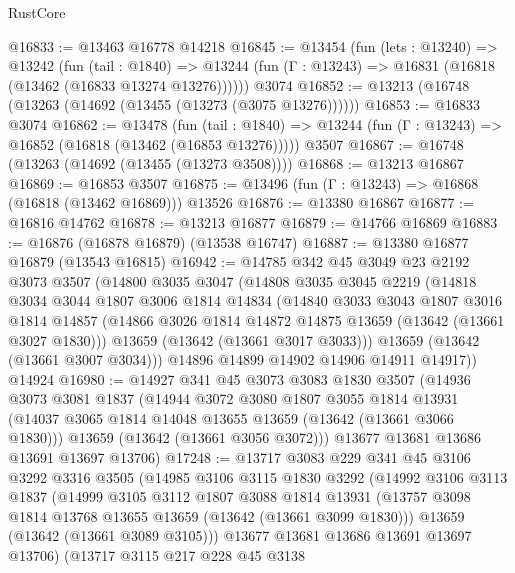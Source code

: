 \begin{lexlean}{RustCore}
\begin{coremodule}
@16833 := @13463 @16778 @14218
@16845 := @13454
    (fun (lets : @13240) =>
    @13242
      (fun (tail : @1840) =>
      @13244 (fun (Γ : @13243) => @16831 (@16818 (@13462 (@16833 @13274 @13276))))))
    @3074
@16852 := @13213 (@16748 (@13263 (@14692 (@13455 (@13273 (@3075 @13276))))))
@16853 := @16833 @3074
@16862 := @13478
    (fun (tail : @1840) => @13244 (fun (Γ : @13243) => @16852 (@16818 (@13462 (@16853 @13276)))))
    @3507
@16867 := @16748 (@13263 (@14692 (@13455 (@13273 @3508))))
@16868 := @13213 @16867
@16869 := @16853 @3507
@16875 := @13496 (fun (Γ : @13243) => @16868 (@16818 (@13462 @16869))) @13526
@16876 := @13380 @16867
@16877 := @16816 @14762
@16878 := @13213 @16877
@16879 := @14766 @16869
@16883 := @16876 (@16878 @16879) (@13538 @16747)
@16887 := @13380 @16877 @16879 (@13543 @16815)
@16942 := @14785
    @342
    @45
    @3049
    @23
    @2192
    @3073
    @3507
    (@14800
      @3035
      @3047
      (@14808
        @3035
        @3045
        @2219
        (@14818
          @3034
          @3044
          @1807
          @3006
          @1814
          @14834
          (@14840
            @3033
            @3043
            @1807
            @3016
            @1814
            @14857
            (@14866 @3026 @1814 @14872 @14875 @13659 (@13642 (@13661 @3027 @1830)))
            @13659
            (@13642 (@13661 @3017 @3033)))
          @13659
          (@13642 (@13661 @3007 @3034)))
        @14896
        @14899
        @14902
        @14906
        @14911
        @14917))
    @14924
@16980 := @14927
    @341
    @45
    @3073
    @3083
    @1830
    @3507
    (@14936
      @3073
      @3081
      @1837
      (@14944
        @3072
        @3080
        @1807
        @3055
        @1814
        @13931
        (@14037 @3065 @1814 @14048 @13655 @13659 (@13642 (@13661 @3066 @1830)))
        @13659
        (@13642 (@13661 @3056 @3072)))
      @13677
      @13681
      @13686
      @13691
      @13697
      @13706)
@17248 := @13717
    @3083
    @229
    @341
    @45
    @3106
    @3292
    @3316
    @3505
    (@14985
      @3106
      @3115
      @1830
      @3292
      (@14992
        @3106
        @3113
        @1837
        (@14999
          @3105
          @3112
          @1807
          @3088
          @1814
          @13931
          (@13757 @3098 @1814 @13768 @13655 @13659 (@13642 (@13661 @3099 @1830)))
          @13659
          (@13642 (@13661 @3089 @3105)))
        @13677
        @13681
        @13686
        @13691
        @13697
        @13706)
      (@13717
        @3115
        @217
        @228
        @45
        @3138

\end{coremodule}
\end{lexlean}
